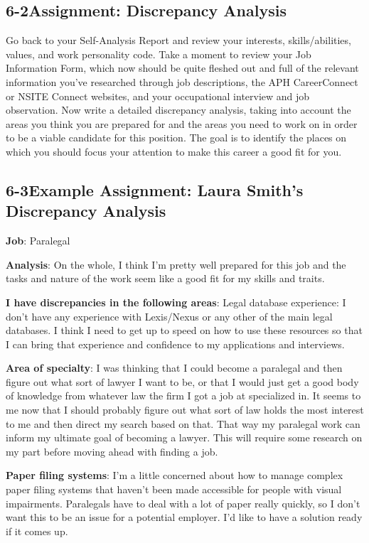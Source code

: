 \pagebreak \subsection*{6-2\quad Assignment: Discrepancy Analysis}
Go back to your Self-Analysis Report and review your interests, skills/abilities, values, and work personality code. Take a moment to review your Job Information Form, which now should be quite fleshed out and full of the relevant information you've researched through job descriptions, the APH CareerConnect or NSITE Connect websites, and your occupational interview and job observation. Now write a detailed discrepancy analysis, taking into account the areas you think you are prepared for and the areas you need to work on in order to be a viable candidate for this position. The goal is to identify the places on which you should focus your attention to make this career a good fit for you.

\pagebreak \subsection*{6-3\quad Example Assignment: Laura Smith's Discrepancy Analysis}
\textbf{Job}: Paralegal

\textbf{Analysis}: On the whole, I think I'm pretty well prepared for this job and the tasks and nature of the work seem like a good fit for my skills and traits.

\textbf{I have discrepancies in the following areas}: Legal database experience: I don't have any experience with Lexis/Nexus or any other of the main legal databases. I think I need to get up to speed on how to use these resources so that I can bring that experience and confidence to my applications and interviews.

\textbf{Area of specialty}: I was thinking that I could become a paralegal and then figure out what sort of lawyer I want to be, or that I would just get a good body of knowledge from whatever law the firm I got a job at specialized in. It seems to me now that I should probably figure out what sort of law holds the most interest to me and then direct my search based on that. That way my paralegal work can inform my ultimate goal of becoming a lawyer. This will require some research on my part before moving ahead with finding a job.

\textbf{Paper filing systems}: I'm a little concerned about how to manage complex paper filing systems that haven't been made accessible for people with visual impairments. Paralegals have to deal with a lot of paper really quickly, so I don't want this to be an issue for a potential employer. I'd like to have a solution ready if it comes up.


